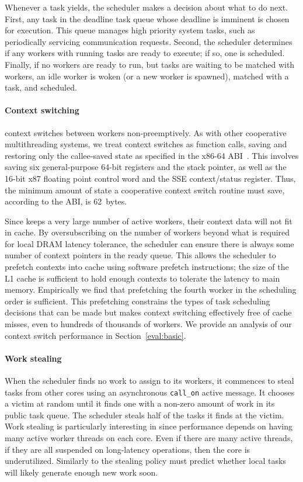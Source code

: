 Whenever a task yields, the scheduler makes a decision about what
to do next. First, any task in the deadline task queue whose deadline
is imminent is chosen for execution. This queue manages high priority
system tasks, such as periodically servicing communication requests. Second,
the scheduler determines if any workers with running tasks are ready to
execute; if so, one is scheduled. Finally, if no workers are ready to
run, but tasks are waiting to be matched with workers, an idle worker is
woken (or a new worker is spawned), matched with a task, and scheduled.

\paragraph{Context switching} 
\Grappa context switches between workers non-preemptively. As with other
cooperative multithreading systems, we treat context switches as function
calls, saving and restoring only the callee-saved state as specified in the
x86-64 ABI~\cite{amd64:abi:2012}. This involves saving six general-purpose
64-bit registers and the stack pointer, as well as the 16-bit x87 floating
point control word and the SSE context/status register. Thus, the minimum
amount of state a cooperative context switch routine must save, according to
the ABI, is 62~bytes.

Since \Grappa keeps a very large number of active workers, their context data
will not fit in cache. By oversubscribing on the number of workers
beyond what is required for local DRAM latency tolerance, the scheduler can
ensure there is always some number of context pointers in the ready
queue. This allows the scheduler to prefetch contexts into
cache using software prefetch instructions; the size of the L1 cache is
sufficient to hold enough contexts to tolerate the latency to main
memory. Empirically we find that prefetching the fourth worker in the scheduling order is
sufficient. This prefetching constrains the types of task scheduling
decisions that can be made but makes context switching effectively
free of cache misses, even to hundreds
of thousands of workers. We provide an analysis of our context switch
performance in Section~\ref{eval:basic}.


\paragraph{Work stealing} 
When the scheduler finds no work to assign to its workers, it commences to
steal tasks from other cores using an asynchronous \texttt{call\_on} active
message. It chooses a victim at random until it finds one with a non-zero
amount of work in its public task queue. The scheduler steals half of the
tasks it finds at the victim. Work stealing is particularly interesting in
\Grappa since performance depends on having many active worker threads on each
core. Even if there are many active threads, if they are all suspended on
long-latency operations, then the core is underutilized. Similarly to
\cite{the_hierarchical_workstealing} the
stealing policy must predict whether local tasks will likely
generate enough new work soon.

